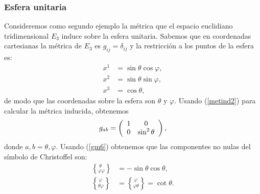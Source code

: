 \subsubsection{Esfera unitaria}

Consideremos como segundo ejemplo la métrica que el espacio euclidiano
tridimensional $E_{3}$ induce sobre la esfera unitaria. Sabemos que en
coordenadas cartesianas la métrica de $E_{3}$ es $g_{ij}=\delta_{ij}$ y la restricción a los puntos de la esfera es:
\begin{align}
x^1  &  =\sin\theta\cos\varphi,\\
x^2  &  =\sin\theta\sin\varphi,\\
x^{3}  &  =\cos\theta,
\end{align}
de modo que las coordenadas sobre la esfera son $\theta$ y $\varphi$. Usando
(\ref{metind2}) para calcular la métrica inducida, obtenemos
\begin{equation}
g_{ab}=\left(
\begin{array}[c]{cc}
1 & 0\\
0 & \sin^2\theta
\end{array}\right) ,  \label{ind7}
\end{equation}
donde $a,b=\theta,\varphi$. Usando (\ref{gm6}) obtenemos que las componentes no
nulas del símbolo de Christoffel son:
\begin{align}
\left\{  _{\varphi\varphi}^{\ \theta}\right\}  &  =-\sin\theta\cos\theta,\label{ind8}\\
\left\{  _{\theta\varphi}^{\, \varphi}\right\}   &  =\left\{  _{\varphi\theta}^{\,\varphi}\right\}  =\cot\theta.
\end{align}

